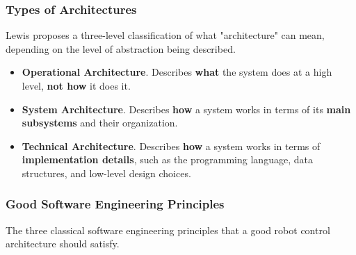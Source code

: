 \subsubsection{ Types of Architectures}

Lewis proposes a three-level classification of what "architecture" can mean, depending on the level of abstraction being described.

\begin{itemize}
\item \textbf{Operational Architecture}.
Describes \textbf{what} the system does at a high level, \textbf{not how} it does it.


\item \textbf{System Architecture}.
Describes \textbf{how} a system works in terms of its \textbf{main subsystems} and their organization.

\item \textbf{Technical Architecture}.
Describes \textbf{how} a system works in terms of \textbf{implementation details}, such as the programming language, data structures, and low-level design choices.

\end{itemize}



\subsubsection{Good Software Engineering Principles}

The three classical software engineering principles that a good robot control architecture should satisfy.

